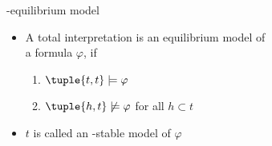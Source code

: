 \begin{frame}{\HTC-equilibrium model}
  \begin{itemize}
  \item A total interpretation  is an \alert{equilibrium model} of\\
    a formula $\varphi$,
    if
    \par
    \smallskip
    \begin{enumerate}\normalsize
    \item
      \(
      \tuple{t,t}\models\varphi
      \)
    \item
      \(
      \tuple{h,t}\not\models\varphi
      \)
      for all $h\subset t$
    \end{enumerate}
    \smallskip
  \item <2-> $t$ is called an \HTC-\alert{stable model} of $\varphi$
  \end{itemize}
\end{frame}
%
